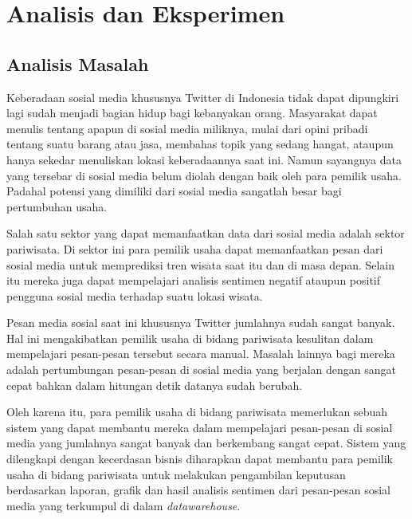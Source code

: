 \chapter{Analisis dan Eksperimen}

\section{Analisis Masalah}
Keberadaan sosial media khususnya Twitter di Indonesia tidak dapat dipungkiri lagi sudah menjadi bagian hidup bagi kebanyakan orang. Masyarakat dapat menulis tentang apapun di sosial media miliknya, mulai dari opini pribadi tentang suatu barang atau jasa, membahas topik yang sedang hangat, ataupun hanya sekedar menuliskan lokasi keberadaannya saat ini. Namun sayangnya data yang tersebar di sosial media belum diolah dengan baik oleh para pemilik usaha. Padahal potensi yang dimiliki dari sosial media sangatlah besar bagi pertumbuhan usaha.

Salah satu sektor yang dapat memanfaatkan data dari sosial media adalah sektor pariwisata. Di sektor ini para pemilik usaha dapat memanfaatkan pesan dari sosial media untuk memprediksi tren wisata saat itu dan di masa depan. Selain itu mereka juga dapat mempelajari analisis sentimen negatif ataupun positif pengguna sosial media terhadap suatu lokasi wisata. 

Pesan media sosial saat ini khususnya Twitter jumlahnya sudah sangat banyak. Hal ini mengakibatkan pemilik usaha di bidang pariwisata kesulitan dalam mempelajari pesan-pesan tersebut secara manual. Masalah lainnya bagi mereka adalah pertumbungan pesan-pesan di sosial media yang berjalan dengan sangat cepat bahkan dalam hitungan detik datanya sudah berubah. 

Oleh karena itu, para pemilik usaha di bidang pariwisata memerlukan sebuah sistem yang dapat membantu mereka dalam mempelajari pesan-pesan di sosial media yang jumlahnya sangat banyak dan berkembang sangat cepat. Sistem yang dilengkapi dengan kecerdasan bisnis diharapkan dapat membantu para pemilik usaha di bidang pariwisata untuk melakukan pengambilan keputusan berdasarkan laporan, grafik dan hasil analisis sentimen dari pesan-pesan sosial media yang terkumpul di dalam \textit{datawarehouse}.



